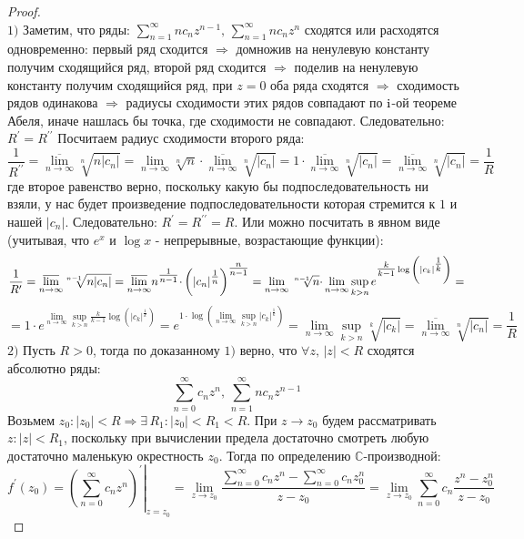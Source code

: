 \documentclass[12pt]{article}
\newcommand{\RN}[1]{%
	\textup{\uppercase\expandafter{\romannumeral#1}}%
}
\newcommand{\MC}{\mathbb{C}}
\theoremstyle{definition}
\newcommand{\ddsum}[2]{\displaystyle\sum\limits_{#1}^{#2}}
\begin{document}
\begin{proof}\hfill\\
	$1)$ Заметим, что ряды: $\ddsum{n = 1}{\infty}n c_n z^{n-1}, \, \ddsum{n = 1}{\infty}n c_n z^{n}$ сходятся или расходятся одновременно: первый ряд сходится $\Rightarrow$ домножив на ненулевую константу получим сходящийся ряд, второй ряд сходится $\Rightarrow$ поделив на ненулевую константу получим сходящийся ряд, при $z = 0$ оба ряда сходятся $\Rightarrow$ сходимость рядов одинакова $\Rightarrow$ радиусы сходимости этих рядов совпадают по $\RN{1}$-ой теореме Абеля, иначе нашлась бы точка, где сходимости не совпадают. Следовательно: $R^\prime = R^{\prime\prime}$ Посчитаем радиус сходимости второго ряда:
	$$
		\dfrac{1}{R^{\prime\prime}} = \underset{n \to \infty}{\overline{\lim}}\sqrt[n]{n|c_n|} = \lim\limits_{n \to \infty}\sqrt[n]{n}{\cdot} \underset{n \to \infty}{\overline{\lim}}\sqrt[n]{|c_n|} = 1{\cdot}\underset{n \to \infty}{\overline{\lim}}\sqrt[n]{|c_n|} = \underset{n \to \infty}{\overline{\lim}}\sqrt[n]{|c_n|} = \dfrac{1}{R}
	$$
	где второе равенство верно, поскольку какую бы подпоследовательность ни взяли, у нас будет произведение подпоследовательности которая стремится к $1$ и нашей $|c_n|$. Следовательно: $R^\prime = R^{\prime\prime} = R$. 
	Или можно посчитать в явном виде (учитывая, что $e^x$ и $\log{x}$ - непрерывные, возрастающие функции):
	$$
		\dfrac{1}{R^\prime} = \underset{n \to \infty}{\overline{\lim}}\sqrt[n - 1]{n|c_n|} =		\underset{n \to \infty}{\overline{\lim}}n\strut^{\tfrac{1}{n-1}}{\cdot}\left(|c_n|^{\tfrac{1}{n}}\right)^{\tfrac{n}{n-1}} = \lim\limits_{n\to \infty} \sqrt[n-1]{n}{\cdot}\lim\limits_{n \to \infty}\sup\limits_{k > n} e^{\tfrac{k}{k- 1}\log{\left(|c_k|^{\tfrac{1}{k}}\right)}} 
		= 
	$$	
	$$
		= 1{\cdot}e^{\lim\limits_{n \to \infty}\sup\limits_{k > n}\tfrac{k}{k-1}\log{\left(|c_k|^{\tfrac{1}{k}}\right)}}= e^{1{\cdot}\log{ \left(\lim\limits_{n \to \infty}\sup\limits_{k > n}|c_k|^{\tfrac{1}{k}}\right)}}= \lim\limits_{n \to \infty}\sup\limits_{k > n}\sqrt[k]{|c_k|}=\underset{n \to \infty}{\overline{\lim}}\sqrt[n ]{|c_n|} = \dfrac{1}{R}
	$$
	$2)$ Пусть $R > 0$, тогда по доказанному $1)$ верно, что $\forall z, \, |z| < R$ сходятся абсолютно ряды:
	$$
		\ddsum{n = 0}{\infty}c_n z^n, \, \ddsum{n = 1}{\infty}n c_n z^{n-1}
	$$
	Возьмем $z_0 \colon |z_0| < R \Rightarrow \exists \, R_1 \colon |z_0| < R_1 <R$.  При $z \to z_0$ будем рассматривать $z \colon |z| < R_1$, поскольку при вычислении предела достаточно смотреть любую достаточно маленькую окрестность $z_0$. Тогда по определению $\MC$-производной:
	$$
		f^\prime(z_0) = \left.\left(\ddsum{n = 0}{\infty}c_n z^n\right)^\prime\right|_{z = z_0} = \lim\limits_{z \to z_0}\dfrac{\ddsum{n = 0}{\infty}c_n z^n - \ddsum{n = 0}{\infty} c_n z_0^{n}}{z - z_0} = \lim\limits_{z \to z_0}\ddsum{n = 0}{\infty}c_n\dfrac{z^n - z_0^n}{z - z_0}
$$
\end{proof}
\end{document}
